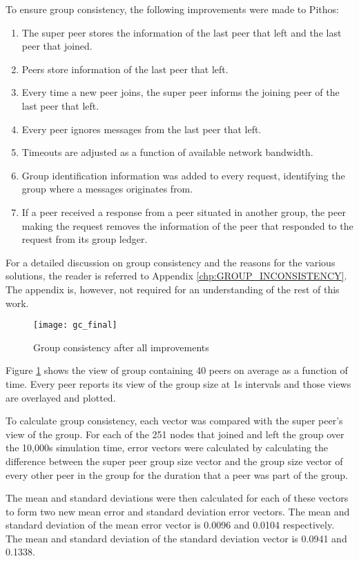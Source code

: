 To ensure group consistency, the following improvements were made to Pithos:
%
\begin{enumerate}
\item The super peer stores the information of the last peer that left and the last peer that joined.
\item Peers store information of the last peer that left.
\item Every time a new peer joins, the super peer informs the joining peer of the last peer that left.
\item Every peer ignores messages from the last peer that left.
\item Timeouts are adjusted as a function of available network bandwidth.
\item Group identification information was added to every request, identifying the group where a messages originates from.
\item If a peer received a response from a peer situated in another group, the peer making the request removes the information of the peer that responded to the request from its group ledger.
\end{enumerate}

For a detailed discussion on group consistency and the reasons for the various solutions, the reader is referred to Appendix \ref{chp:GROUP_INCONSISTENCY}. The appendix is, however, not required for an understanding of the rest of this work.

\begin{figure}[htbp]
 \centering
 \texttt{[image: gc\_final]}
 \caption{Group consistency after all improvements}
 \label{fig_gc_final}
\end{figure}
%
Figure \ref{fig_gc_final} shows the view of group containing 40 peers on average as a function of time. Every peer reports its view of the group size at 1s intervals and those views are overlayed and plotted.

To calculate group consistency, each vector was compared with the super peer's view of the group. For each of the 251 nodes that joined and left the group over the 10,000s simulation time, error vectors were calculated by calculating the difference between the super peer group size vector and the group size vector of every other peer in the group for the duration that a peer was part of the group.

The mean and standard deviations were then calculated for each of these vectors to form two new mean error and standard deviation error vectors. The mean and standard deviation of the mean error vector is 0.0096 and 0.0104 respectively. The mean and standard deviation of the standard deviation vector is 0.0941 and 0.1338.

